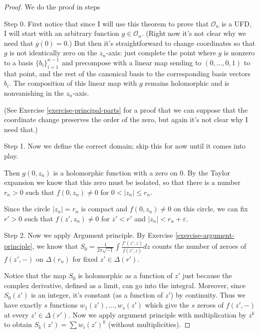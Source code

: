 \begin{proof}
We do the proof in steps

\medskip\noindent
Step 0. First notice that since I will use this theorem
to prove that $\mathcal{O}_n$ is a UFD, I will start with
an arbitrary function $g \in \mathcal{O}_n$.
(Right now it's not clear why we need that $g(0)=0$.)
But then it's straightforward to change coordinates so that $g$
is not identically zero on the  $z_n$-axis:
just complete the point where $g$ is nonzero to a basis $\{b_i\}_{i=1}^{n-1}$
and precompose with a linear map sending to $(0,\ldots,0,1)$
to that point, and the rest of the canonical basis
to the corresponding basis vectors $b_i$.
The composition of this linear map with $g$ remains holomorphic
and is nonvanishing in the $z_n$-axis.

(See Exercise \ref{exercise-principal-parts} for a proof that we can suppose
that the coordinate change preserves the order of the zero,
but again it's not clear why I need that.)

\medskip\noindent
Step 1. Now we define the correct domain;
skip this for now until it comes into play.

Then $g(0,z_n)$ is a holomorphic function with a zero on $0$. By
the Taylor expansion we know that this zero must be isolated, so that there is a
number $r_n>0$ such that $f(0,z_n)\neq 0$ for  $0<|z_n|\leq r_n$.

Since the circle $|z_n|=r_n$ is compact and $f(0,z_n)\neq 0$ on this circle, we
can fix $r'>0$ such that $f(z',z_n)\neq 0$ for $z'<r'$ and $|z_n|<
r_n+\varepsilon$.

\medskip\noindent
Step 2. Now we apply Argument principle. 
By Exercise
\ref{exercise-argument-principle}, we know that 
$S_0=\frac{1}{2\pi\sqrt{-1}}\int\frac{f'(z',z)}{f(z',z)}dz$ counts the number of
zeroes of $f(z',-)$ on $\Delta(r_n)$ for fixed $z' \in \Delta(r')$.

Notice that the map $S_0$ is holomorphic as a function of $z'$ just because the
complex derivative, defined as a limit, can go into the integral.
Moreover, since
$S_0(z')$ is an integer,
it's constant (as a function of $z'$) by continuity.
Thus we have exactly $s$ functions
$w_1(z'),\ldots,w_s(z')$ which give the $s$ zeroes of $f(z',-)$
at every $z' \in \Delta(r')$. 
Now we apply argument principle with multiplication by
$z^k$ to obtain $S_k(z')=\sum w_i(z')^k$ (without multiplicities).


\end{proof}
